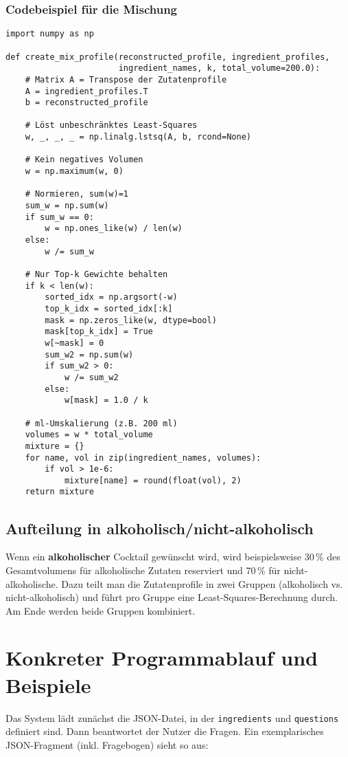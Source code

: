 \documentclass[12pt,a4paper]{report}
\begin{document}
\subsubsection*{Codebeispiel für die Mischung}
\begin{lstlisting}[style=custompython, caption={Berechnung der Mischprofile mit Least Squares}]
import numpy as np

def create_mix_profile(reconstructed_profile, ingredient_profiles, 
                       ingredient_names, k, total_volume=200.0):
    # Matrix A = Transpose der Zutatenprofile
    A = ingredient_profiles.T  
    b = reconstructed_profile
    
    # Löst unbeschränktes Least-Squares
    w, _, _, _ = np.linalg.lstsq(A, b, rcond=None)
    
    # Kein negatives Volumen
    w = np.maximum(w, 0)
    
    # Normieren, sum(w)=1
    sum_w = np.sum(w)
    if sum_w == 0:
        w = np.ones_like(w) / len(w)
    else:
        w /= sum_w
    
    # Nur Top-k Gewichte behalten
    if k < len(w):
        sorted_idx = np.argsort(-w)
        top_k_idx = sorted_idx[:k]
        mask = np.zeros_like(w, dtype=bool)
        mask[top_k_idx] = True
        w[~mask] = 0
        sum_w2 = np.sum(w)
        if sum_w2 > 0:
            w /= sum_w2
        else:
            w[mask] = 1.0 / k

    # ml-Umskalierung (z.B. 200 ml)
    volumes = w * total_volume
    mixture = {}
    for name, vol in zip(ingredient_names, volumes):
        if vol > 1e-6:
            mixture[name] = round(float(vol), 2)
    return mixture
\end{lstlisting}

\subsection{Aufteilung in alkoholisch/nicht-alkoholisch}
Wenn ein \textbf{alkoholischer} Cocktail gewünscht wird, wird beispielsweise 30\,\% des Gesamtvolumens für alkoholische Zutaten reserviert und 70\,\% für nicht-alkoholische. Dazu teilt man die Zutatenprofile in zwei Gruppen (alkoholisch vs. nicht-alkoholisch) und führt pro Gruppe eine Least-Squares-Berechnung durch. Am Ende werden beide Gruppen kombiniert.

\section{Konkreter Programmablauf und Beispiele}
Das System lädt zunächst die JSON-Datei, in der \texttt{ingredients} und \texttt{questions} definiert sind. Dann beantwortet der Nutzer die Fragen. Ein exemplarisches JSON-Fragment (inkl. Fragebogen) sieht so aus:
\end{document}
